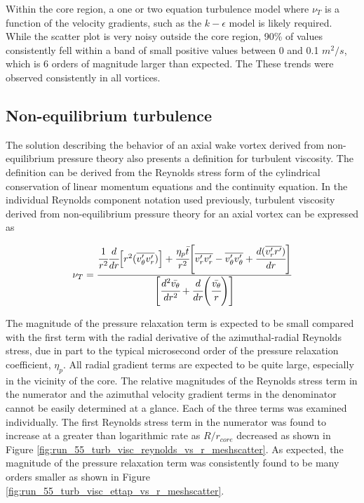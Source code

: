 

\noindent
Within the core region, a one or two equation turbulence model where $\nu_T$ is 
a function of the velocity gradients, such as the $k-\epsilon$ model is likely 
required. While the scatter plot is very noisy outside the core region, 
90\% of values consistently fell within a band of small positive values between 
0 and 0.1 $m^2/s$, which is 6 orders of magnitude larger than expected. The 
These trends were observed consistently in all vortices.

\subsection{Non-equilibrium turbulence}
The solution describing the behavior of an axial wake vortex derived from 
non-equilibrium pressure theory also presents a definition for turbulent 
viscosity. The definition can be derived from the Reynolds stress form of the 
cylindrical conservation of linear momentum equations and the continuity 
equation. In the individual Reynolds component notation used previously, 
turbulent viscosity derived from non-equilibrium pressure theory for an axial 
vortex can be expressed as

\begin{equation}
\nu_T =
    \cfrac{\cfrac{1}{r^2}\cfrac{d}{dr}\Big[r^2 (\overline{v_{\theta}^\prime 
    v_{r}^\prime})\Big] +
	\cfrac{\eta_p \bar{t}}{r^2}\Bigg[\overline{v_{r}^\prime v_{r}^\prime} - 
	\overline{v_{\theta}^\prime v_{\theta}^\prime} + 
	\cfrac{d(\overline{v_{r}^\prime 
	r^\prime})}{dr}\Bigg]} {\Bigg[\cfrac{d^2 \bar{v_{\theta}}}{dr^2} + 
	\cfrac{d}{dr}
	\Bigg(\cfrac{\bar{v_{\theta}}}{r}\Bigg)\Bigg]}
\label{eq:etap_nut}
\end{equation}

\noindent
The magnitude of the pressure relaxation term is expected to be small compared 
with the first term with the radial derivative of the azimuthal-radial Reynolds 
stress, due in part to the typical microsecond order of the pressure relaxation 
coefficient, $\eta_p$. All radial gradient terms are expected to be quite 
large, especially in the vicinity of the core. The relative magnitudes of the 
Reynolds stress term in the numerator and the azimuthal velocity gradient terms 
in the denominator cannot be easily determined at a glance. Each of the three 
terms was examined individually. The first Reynolds stress term in the 
numerator was found to increase at a greater than logarithmic rate as 
$R/r_{core}$ decreased as shown in Figure 
\ref{fig:run_55_turb_visc_reynolds_vs_r_meshscatter}. As expected, the 
magnitude of the pressure relaxation term was consistently found to be many 
orders smaller as shown in Figure 
\ref{fig:run_55_turb_visc_ettap_vs_r_meshscatter}.

